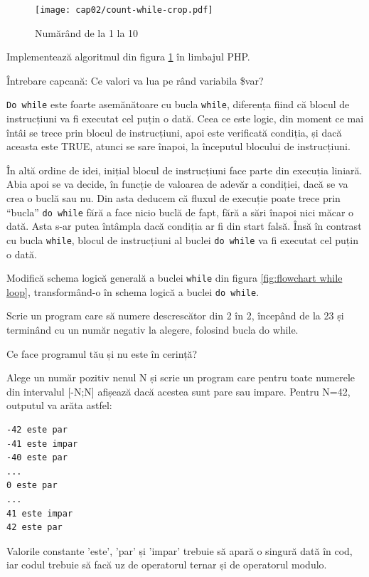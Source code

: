 \begin{figure}[ht!]
  \centering
    \texttt{[image: cap02/count-while-crop.pdf]}
  \caption{Numărând de la 1 la 10}
  \label{fig:while counting}
\end{figure}

\begin{Exercise}[title={Numărătoarea din 1 în 1 cu while},difficulty=1]
\ExePart
Implementează algoritmul din figura \ref{fig:while counting} în limbajul PHP.

\ExePart
Întrebare capcană: Ce valori va lua pe rând variabila \$var?
\end{Exercise}

\texttt{Do while} este foarte asemănătoare cu bucla \texttt{while},
diferența fiind că blocul de instrucțiuni va fi executat cel
puțin o dată. Ceea ce este logic, din moment ce mai întâi se
trece prin blocul de instrucțiuni, apoi este verificată condiția, și
dacă aceasta este TRUE, atunci se sare înapoi, la începutul blocului de
instrucțiuni.

În altă ordine de idei, inițial blocul de instrucțiuni
face parte din execuția liniară. Abia apoi se va decide, în funcție de valoarea
de adevăr a condiției, dacă se va crea o buclă sau nu. Din asta deducem
că fluxul de execuție poate trece prin ``bucla'' \texttt{do while} fără
a face nicio buclă de fapt, fără a sări înapoi nici măcar o dată. Asta s-ar putea
întâmpla dacă condiția ar fi din start falsă. Însă în contrast cu bucla
\texttt{while}, blocul de instrucțiuni al buclei \texttt{do while} va fi executat cel
puțin o dată.

\begin{Exercise}[title={Schema logică a buclei do while},difficulty=1]
Modifică schema logică generală a buclei \texttt{while} din
figura \ref{fig:flowchart while loop}, transformând-o în
schema logică a buclei \texttt{do while}.
\end{Exercise}


\begin{Exercise}[title={Numărătoarea din doi în doi cu do while},difficulty=1]
\ExePart
Scrie un program care să numere descrescător din 2 în 2, începând de la 23
și terminând cu un număr negativ la alegere, folosind bucla do while.

\ExePart
Ce face programul tău și nu este în cerință?
\end{Exercise}

\begin{Exercise}[title={Par sau impar?},difficulty=2]
Alege un număr pozitiv nenul N și scrie un program care
pentru toate numerele din intervalul [-N;N] afișează dacă acestea sunt pare
sau impare. Pentru N=42, outputul va arăta astfel:
\begin{verbatim}
-42 este par
-41 este impar
-40 este par
...
0 este par
...
41 este impar
42 este par
\end{verbatim}
Valorile constante 'este', 'par' și 'impar' trebuie să apară o singură dată în
cod, iar codul trebuie să facă uz de operatorul ternar și de operatorul modulo.
\end{Exercise}

